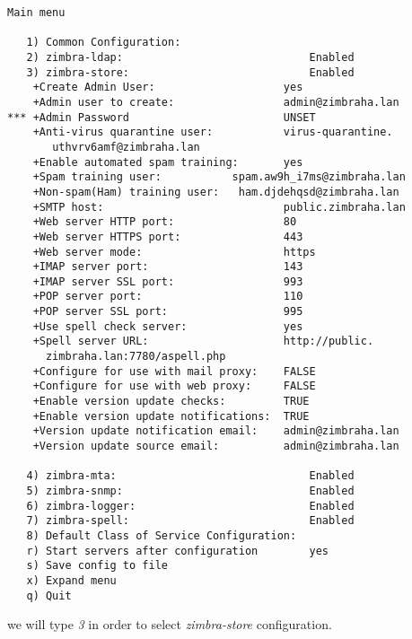 \begin{verbatim}
Main menu

   1) Common Configuration:                                                  
   2) zimbra-ldap:                             Enabled                       
   3) zimbra-store:                            Enabled                       
    +Create Admin User:                    yes                           
    +Admin user to create:                 admin@zimbraha.lan            
*** +Admin Password                        UNSET                         
    +Anti-virus quarantine user:           virus-quarantine.
       uthvrv6amf@zimbraha.lan
    +Enable automated spam training:       yes                           
    +Spam training user:           spam.aw9h_i7ms@zimbraha.lan   
    +Non-spam(Ham) training user:   ham.djdehqsd@zimbraha.lan     
    +SMTP host:                            public.zimbraha.lan           
    +Web server HTTP port:                 80                            
    +Web server HTTPS port:                443                           
    +Web server mode:                      https                         
    +IMAP server port:                     143                           
    +IMAP server SSL port:                 993                           
    +POP server port:                      110                           
    +POP server SSL port:                  995                           
    +Use spell check server:               yes                           
    +Spell server URL:                     http://public.
      zimbraha.lan:7780/aspell.php
    +Configure for use with mail proxy:    FALSE                         
    +Configure for use with web proxy:     FALSE                         
    +Enable version update checks:         TRUE                          
    +Enable version update notifications:  TRUE                          
    +Version update notification email:    admin@zimbraha.lan            
    +Version update source email:          admin@zimbraha.lan            

   4) zimbra-mta:                              Enabled                       
   5) zimbra-snmp:                             Enabled                       
   6) zimbra-logger:                           Enabled                       
   7) zimbra-spell:                            Enabled                       
   8) Default Class of Service Configuration:                                
   r) Start servers after configuration        yes                           
   s) Save config to file                                                    
   x) Expand menu                                                            
   q) Quit
\end{verbatim}
we will type \textit{3} in order to select \textit {zimbra-store} configuration.


